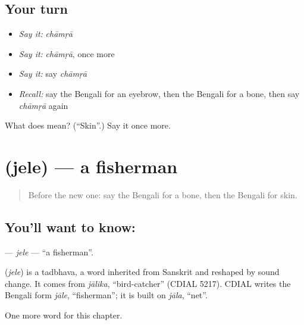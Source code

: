 \subsection*{Your turn}
\begin{itemize}
\raggedright
  \item \emph{Say it:} \emph{chāmṛā}
  \item \emph{Say it:} \emph{chāmṛā}, once more
  \item \emph{Say it:} say \emph{chāmṛā}
  \item \emph{Recall:} say the Bengali for an eyebrow, then the Bengali for a bone, then say \emph{chāmṛā} again
\end{itemize}

\begin{tcolorbox}[breakable,colback=teal!4,colframe=teal!35!black,title={Before you move on}]
What does  mean? (\textquotedblleft{}Skin\textquotedblright{}.) Say it once more.
\end{tcolorbox}
\section[\texorpdfstring{\bn{জেলে} (jele)}{জেলে (jele)}]{ (jele) — a fisherman}

\label{lesson:BN-C125-jele}



\begin{quote}
Before the new one: say the Bengali for a bone, then the Bengali for skin.
\end{quote}

\subsection*{You'll want to know: }
\textbf{} — \emph{jele} — \textquotedblleft{}a fisherman\textquotedblright{}.

\begin{cousinweb}
\textbf{} (\emph{jele}) is a tadbhava, a word inherited from Sanskrit and reshaped by sound change. It comes from \emph{jālika}, \textquotedblleft{}bird-catcher\textquotedblright{} (CDIAL 5217). CDIAL writes the Bengali form \emph{jāle}, \textquotedblleft{}fisherman\textquotedblright{}; it is built on \emph{jāla}, \textquotedblleft{}net\textquotedblright{}.
\end{cousinweb}

\begin{grammarlens}[title={What you've built}]
One more word for this chapter.
\end{grammarlens}


